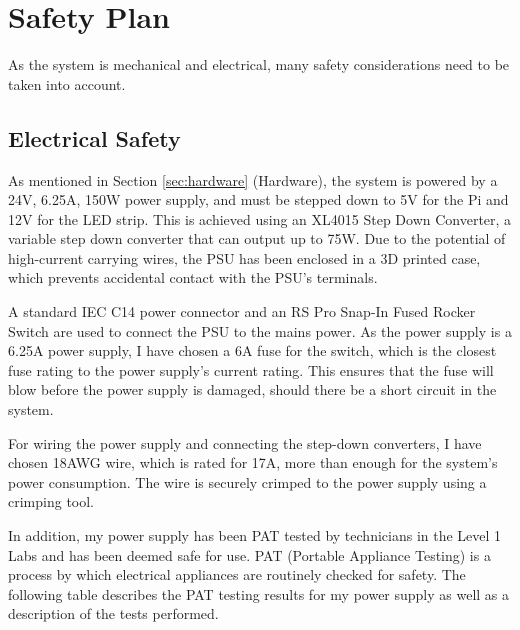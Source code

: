 \section{Safety Plan}
As the system is mechanical and electrical, many safety considerations need to be taken into account.
\subsection{Electrical Safety}
As mentioned in Section \ref*{sec:hardware} (Hardware), the system is powered by a 24V, 6.25A, 150W power supply, and must be stepped down to 5V for the Pi and 12V for the LED strip. This is achieved using an XL4015 Step Down Converter\cite{xl4015}, a variable step down converter that can output up to 75W.
Due to the potential of high-current carrying wires, the PSU has been enclosed in a 3D printed case, which prevents accidental contact with the PSU's terminals.

A standard IEC C14 power connector and an RS Pro Snap-In Fused Rocker Switch\cite{rsproc14switch} are used to connect the PSU to the mains power.
As the power supply is a 6.25A power supply, I have chosen a 6A fuse for the switch, which is the closest fuse rating to the power supply's
current rating. This ensures that the fuse will blow before the power supply is damaged, should there be a short circuit in the system.

For wiring the power supply and connecting the step-down converters, I have chosen 18AWG wire, which is rated for 17A\cite{18awgwire}, 
more than enough for the system's power consumption. The wire is securely crimped to the power supply using a crimping tool.

In addition, my power supply has been PAT tested by technicians in the Level 1 Labs and has been deemed safe for use.
PAT (Portable Appliance Testing) is a process by which electrical appliances are routinely checked for safety\cite{patwiki}\cite{patspec}.
The following table describes the PAT testing results for my power supply as well as a description of the tests performed.

